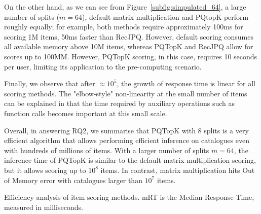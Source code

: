 \documentclass[sigconf,natbib=true, review=true]{acmart} %
\newcommand{\rsasha}[1]{\textcolor[HTML]{FF0000}{#1}}
\begin{document}
On the other hand, as we can see from Figure~\ref{subfig:simpulated_64}, a large number of splits ($m=64$), default matrix multiplication and PQtopK perform roughly equally; for example, both methods require approximately 100ms for scoring 1M items, \rsasha{50ms faster than RecJPQ}. However, default scoring consumes all available memory above 10M items, whereas PQTopK and RecJPQ allow for scores up to 100MM. However, PQTopK scoring, in this case, requires 10 seconds per user, limiting its application to the pre-computing scenario. 

Finally, we observe that after $\approx 10^5$, the growth of response time is linear for all scoring methods. The "elbow-style" non-linearity at the small number of items can be explained in that the time required by auxiliary operations such as function calls becomes important at this small scale. 

Overall, in answering RQ2, we summarise that PQTopK with 8 splits is a very efficient algorithm that allows performing efficient inference on catalogues even with hundreds of millions of items. With a larger number of splits $m=64$, the inference time of PQTopK is similar to the default matrix multiplication scoring, but it allows scoring up to $10^8$ items. In contrast, matrix multiplication hits Out of Memory error with catalogues larger than  $10^7$ items. 

\begin{table}
\caption{Efficiency analysis of item scoring methods. mRT is the Median Response Time, measured in milliseconds.} \label{tb:main}
\resizebox{\linewidth}{!}{
    
}
\end{table}
\end{document}
